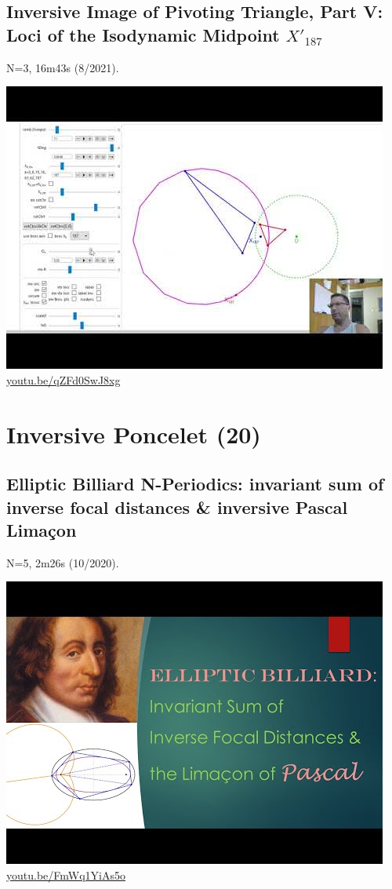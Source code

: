 \documentclass[12pt]{amsart}
\begin{document}
\subsection{Inversive Image of Pivoting Triangle, Part V: Loci of the Isodynamic Midpoint $X'_{187}$}
\label{vid:qZFd0SwJ8xg}
\noindent N=3, 16m43s (8/2021). 
\begin{center}\includegraphics[width=.5\textwidth]{pics/qZFd0SwJ8xg.jpg} \\ 
\href{https://youtu.be/qZFd0SwJ8xg}{\url{youtu.be/qZFd0SwJ8xg}}\end{center}
% 

\section{Inversive Poncelet (20)}

\subsection{Elliptic Billiard N-Periodics: invariant sum of inverse focal distances \& inversive Pascal Limaçon}
\label{vid:FmWq1YiAs5o}
\noindent N=5, 2m26s (10/2020). 
\begin{center}\includegraphics[width=.5\textwidth]{pics/FmWq1YiAs5o.jpg} \\ 
\href{https://youtu.be/FmWq1YiAs5o}{\url{youtu.be/FmWq1YiAs5o}}\end{center}
% 
\end{document}
